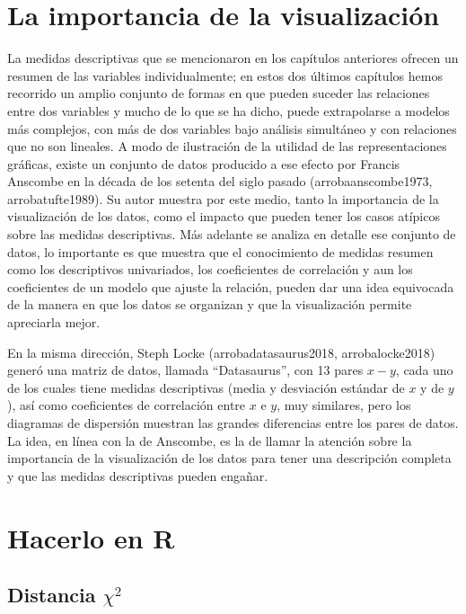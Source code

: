 \documentclass[]{book}
\begin{document}
\hypertarget{la-importancia-de-la-visualizacion}{%
\section{La importancia de la visualización}\label{la-importancia-de-la-visualizacion}}

La medidas descriptivas que se mencionaron en los capítulos anteriores ofrecen un resumen de las variables individualmente; en estos dos últimos capítulos hemos recorrido un amplio conjunto de formas en que pueden suceder las relaciones entre dos variables y mucho de lo que se ha dicho, puede extrapolarse a modelos más complejos, con más de dos variables bajo análisis simultáneo y con relaciones que no son lineales.
A modo de ilustración de la utilidad de las representaciones gráficas, existe un conjunto de datos producido a ese efecto por Francis Anscombe en la década de los setenta del siglo pasado (arrobaanscombe1973, arrobatufte1989). Su autor muestra por este medio, tanto la importancia de la visualización de los datos, como el impacto que pueden tener los casos atípicos sobre las medidas descriptivas. Más adelante se analiza en detalle ese conjunto de datos, lo importante es que muestra que el conocimiento de medidas resumen como los descriptivos univariados, los coeficientes de correlación y aun los coeficientes de un modelo que ajuste la relación, pueden dar una idea equivocada de la manera en que los datos se organizan y que la visualización permite apreciarla mejor.

En la misma dirección, Steph Locke (arrobadatasaurus2018, arrobalocke2018) generó una matriz de datos, llamada ``Datasaurus'', con 13 pares \(x-y\), cada uno de los cuales tiene medidas descriptivas (media y desviación estándar de \(x\) y de \(y\)), así como coeficientes de correlación entre \(x\) e \(y\), muy similares, pero los diagramas de dispersión muestran las grandes diferencias entre los pares de datos. La idea, en línea con la de Anscombe, es la de llamar la atención sobre la importancia de la visualización de los datos para tener una descripción completa y que las medidas descriptivas pueden engañar.

\hypertarget{hacerlo-en-r-3}{%
\section{Hacerlo en R}\label{hacerlo-en-r-3}}

\hypertarget{distancia-chi2}{%
\subsection{\texorpdfstring{Distancia \(\chi^{2}\)}{Distancia \textbackslash{}chi\^{}\{2\}}}\label{distancia-chi2}}
\end{document}
